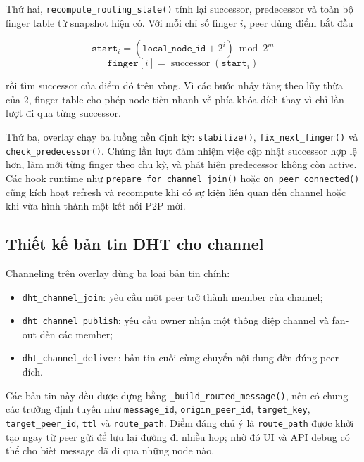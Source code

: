 Thứ hai, \texttt{recompute\_routing\_state()} tính lại successor, predecessor và toàn bộ finger table từ snapshot hiện có. Với mỗi chỉ số finger $i$, peer dùng điểm bắt đầu
\begin{center}
\[
\texttt{start}_i = (\texttt{local\_node\_id} + 2^i) \bmod 2^m
\]
\[
\texttt{finger}[i] = \operatorname{successor}(\texttt{start}_i)
\]
\end{center}
rồi tìm successor của điểm đó trên vòng. Vì các bước nhảy tăng theo lũy thừa của 2, finger table cho phép node tiến nhanh về phía khóa đích thay vì chỉ lần lượt đi qua từng successor.

Thứ ba, overlay chạy ba luồng nền định kỳ: \texttt{stabilize()}, \texttt{fix\_next\_finger()} và \texttt{check\_predecessor()}. Chúng lần lượt đảm nhiệm việc cập nhật successor hợp lệ hơn, làm mới từng finger theo chu kỳ, và phát hiện predecessor không còn active. Các hook runtime như \texttt{prepare\_for\_channel\_join()} hoặc \texttt{on\_peer\_connected()} cũng kích hoạt refresh và recompute khi có sự kiện liên quan đến channel hoặc khi vừa hình thành một kết nối P2P mới.

\subsection{Thiết kế bản tin DHT cho channel}
Channeling trên overlay dùng ba loại bản tin chính:
\begin{itemize}[leftmargin=2em]
    \item \texttt{dht\_channel\_join}: yêu cầu một peer trở thành member của channel;
    \item \texttt{dht\_channel\_publish}: yêu cầu owner nhận một thông điệp channel và fan-out đến các member;
    \item \texttt{dht\_channel\_deliver}: bản tin cuối cùng chuyển nội dung đến đúng peer đích.
\end{itemize}

Các bản tin này đều được dựng bằng \texttt{\_build\_routed\_message()}, nên có chung các trường định tuyến như \texttt{message\_id}, \texttt{origin\_peer\_id}, \texttt{target\_key}, \texttt{target\_peer\_id}, \texttt{ttl} và \texttt{route\_path}. Điểm đáng chú ý là \texttt{route\_path} được khởi tạo ngay từ peer gửi để lưu lại đường đi nhiều hop; nhờ đó UI và API debug có thể cho biết message đã đi qua những node nào.

